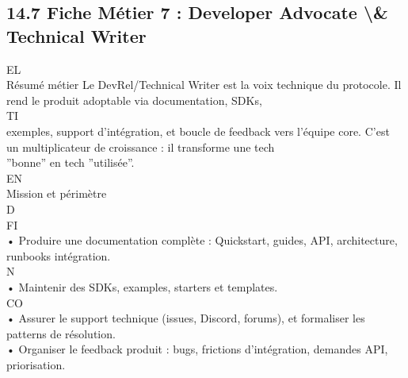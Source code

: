 \documentclass[12pt,landscape,a4paper]{article}
\begin{document}
\subsection{14.7 Fiche Métier 7 : Developer Advocate \textbackslash{}& Technical Writer}
\vspace{0.5em}
\vspace{0.5em}
\vspace{0.5em}
\vspace{0.5em}
EL\\
Résumé métier Le DevRel/Technical Writer est la voix technique du protocole. Il rend le produit adoptable via documentation, SDKs,\\
\vspace{0.5em}
\vspace{0.5em}
\vspace{0.5em}
\vspace{0.5em}
TI\\
exemples, support d’intégration, et boucle de feedback vers l’équipe core. C’est un multiplicateur de croissance : il transforme une tech\\
”bonne” en tech ”utilisée”.\\
\vspace{0.5em}
\vspace{0.5em}
\vspace{0.5em}
\vspace{0.5em}
EN\\
Mission et périmètre\\
\vspace{0.5em}
\vspace{0.5em}
\vspace{0.5em}
\vspace{0.5em}
D\\
FI\\
• Produire une documentation complète : Quickstart, guides, API, architecture, runbooks intégration.\\
\vspace{0.5em}
N\\
• Maintenir des SDKs, examples, starters et templates.\\
CO\\
• Assurer le support technique (issues, Discord, forums), et formaliser les patterns de résolution.\\
\vspace{0.5em}
• Organiser le feedback produit : bugs, frictions d’intégration, demandes API, priorisation.\\
\vspace{0.5em}
\end{document}
